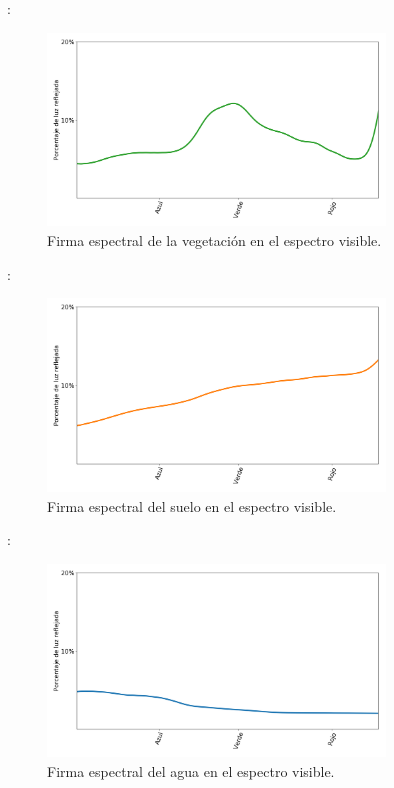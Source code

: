 \documentclass[handout,aspectratio=169]{beamer}
\begin{document}
\begin{frame}{\secname : \subsecname}
    \begin{figure}[h!]
        \centering
        \includegraphics[width=0.8\textwidth]{fig:v.png}
        \caption{Firma espectral de la vegetación en el espectro visible.}
        \label{fig:v}
    \end{figure}
\end{frame}

\begin{frame}{\secname : \subsecname}
    \begin{figure}[h!]
        \centering
        \includegraphics[width=0.8\textwidth]{fig:s.png}
        \caption{Firma espectral del suelo en el espectro visible.}
        \label{fig:s}
    \end{figure}
\end{frame}

\begin{frame}{\secname : \subsecname}
    \begin{figure}[h!]
        \centering
        \includegraphics[width=0.8\textwidth]{fig:a.png}
        \caption{Firma espectral del agua en el espectro visible.}
        \label{fig:a}
    \end{figure}
\end{frame}
\end{document}
